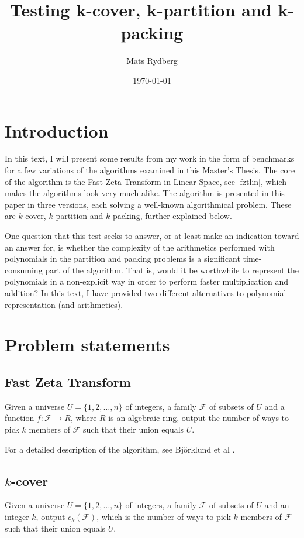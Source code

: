 \documentclass[a4paper, titlepage]{article}
\title{\huge{Testing k-cover, k-partition and k-packing}}
\author{Mats Rydberg}
\date{\today}
\begin{document}
\maketitle

\section{Introduction}
In this text, I will present some results from my work in the form of benchmarks for a few variations of the algorithms examined in this Master's Thesis. The core of the algorithm is the Fast Zeta Transform in Linear Space, see \ref{fztlin}, which makes the algorithms look very much alike. The algorithm is presented in this paper in three versions, each solving a well-known algorithmical problem. These are $k$-cover, $k$-partition and $k$-packing, further explained below.

One question that this test seeks to answer, or at least make an indication toward an answer for, is whether the complexity of the arithmetics performed with polynomials in the partition and packing problems is a significant time-consuming part of the algorithm. That is, would it be worthwhile to represent the polynomials in a non-explicit way in order to perform faster multiplication and addition? In this text, I have provided two different alternatives to polynomial representation (and arithmetics).

\section{Problem statements}

\subsection{Fast Zeta Transform}
Given a universe $U = \{1, 2, \ldots, n\}$ of integers, a family $\mathcal{F}$ of subsets of $U$ and a function $f: \mathcal{F} \rightarrow R$, where $R$ is an algebraic ring, output the number of ways to pick $k$ members of $\mathcal{F}$ such that their union equals $U$.

For a detailed description of the algorithm, see Björklund et al \cite{cov_pack}.

\subsection{$k$-cover}
Given a universe $U = \{1, 2, \ldots, n\}$ of integers, a family $\mathcal{F}$ of subsets of $U$ and an integer $k$, output $c_k(\mathcal{F})$, which is the number of ways to pick $k$ members of $\mathcal{F}$ such that their union equals $U$.
\end{document}
